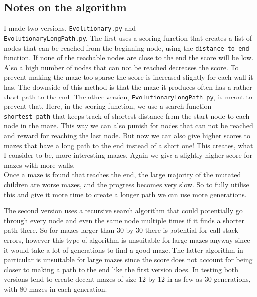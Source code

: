 \documentclass[10pt, a4paper, twoside]{amsart}
\newcommand{\1}{\mathbbm{1}}
\begin{document}
\subsection{Notes on the algorithm}
I made two versions, \verb+Evolutionary.py+ and\\ \verb+EvolutionaryLongPath.py+.
The first uses a scoring function that creates a list of nodes that can be reached from the beginning node, using the \verb+distance_to_end+ function. If none of the reachable nodes are close to the end the score will be low. Also a high number of nodes that can not be reached decreases the score. To prevent making the maze too sparse the score is increased slightly for each wall it has. The downside of this method is that the maze it produces often has a rather short path to the end.
The other version, \verb+EvolutionaryLongPath.py+, is meant to prevent that. Here, in the scoring function, we use a search function \verb+shortest_path+ that keeps track of shortest distance from the start node to each node in the maze. This way we can also punish for nodes that can not be reached and reward for reaching the last node. But now we can also give higher scores to mazes that have a long path to the end instead of a short one! This creates, what I consider to be, more interesting mazes. Again we give a slightly higher score for mazes with more walls.\\
Once a maze is found that reaches the end, the large majority of the mutated children are worse mazes, and the progress becomes very slow. So to fully utilise this and give it more time to create a longer path we can use more generations.

The second version uses a recursive search algorithm that could potentially go through every node and even the same node multiple times if it finds a shorter path there. So for mazes larger than $30$ by $30$ there is potential for call-stack errors, however this type of algorithm is unsuitable for large mazes anyway since it would take a lot of generations to find a good maze. The latter algorithm in particular is unsuitable for large mazes since the score does not account for being closer to making a path to the end like the first version does.
In testing both versions tend to create decent mazes of size $12$ by $12$ in as few as $30$ generations, with $80$ mazes in each generation. 



 
\end{document}
